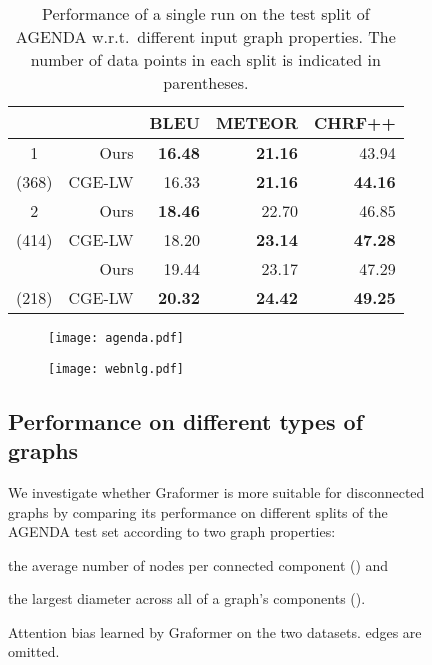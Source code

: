 \documentclass[11pt]{article}
\begin{document}
\begin{figure}
\begin{tabular}
\begin{table}[t]
	\vspace{.5em}
	\begin{subtable}{\linewidth}
		\centering
		\small
		\begin{tabular}{crrrr}
			\toprule
			&& BLEU & METEOR & CHRF++ \\
			\midrule
			1 & Ours & \textbf{16.48} & \textbf{21.16} & 43.94 \\
			(368) & CGE-LW & 16.33 & \textbf{21.16} & \textbf{44.16} \\
			\midrule
			2 & Ours & \textbf{18.46} & 22.70 & 46.85 \\
			(414) & CGE-LW & 18.20 & \textbf{23.14} & \textbf{47.28} \\
			\midrule
			 & Ours & 19.44 & 23.17 & 47.29 \\
			(218) & CGE-LW & \textbf{20.32} & \textbf{24.42} & \textbf{49.25} \\
			\bottomrule
		\end{tabular}
		\label{tab:diameter}
	\end{subtable}
	\caption{Performance of a single run on the test split of AGENDA w.r.t.\ different input graph properties. The number of data points in each split is indicated in parentheses.}
	\label{tab:analysis}
\end{table}


\begin{figure*}[t]
	\begin{subfigure}{.49\linewidth}
		\centering
		\texttt{[image: agenda.pdf]}
		\label{fig:attention-agenda}
	\end{subfigure}
\begin{subfigure}{.49\linewidth}
		\centering
		\texttt{[image: webnlg.pdf]}
		\label{fig:attention-webnlg}
	\end{subfigure}
	
	\caption{Attention bias  learned by Graformer on the two datasets.  edges are omitted.}
	\label{fig:attention}
\end{figure*}


\subsection{Performance on different types of graphs}

We investigate whether Graformer is more suitable for disconnected graphs
by comparing its performance on different splits of the AGENDA test set according to two graph properties:
\begin{enumerate*}[label=(\roman*)]
	\item the average number of nodes per connected component () and
	\item the largest diameter across all of a graph's components ().
\end{enumerate*}


\end{tabular}
\end{figure}
\end{document}
